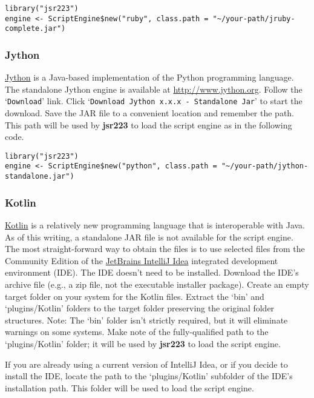 \documentclass[
article,
11pt, %
a4paper, %
oneside, %
headinclude,footinclude, %
]{scrartcl}
\theoremstyle{definition} %
\theoremstyle{plain} %
\theoremstyle{remark} %
\newcommand{\pkg}[1]{\textbf{#1}}
\newcommand{\file}[1]{{`\normalfont\textsf{#1}'}}
\newcommand{\samp}[1]{{`\normalfont\texttt{#1}'}}
\newcommand{\strong}[1]{\texorpdfstring{{\normalfont\fontseries{b}\selectfont #1}}{#1}}
\begin{document}
\begin{verbatim}
library("jsr223")
engine <- ScriptEngine$new("ruby", class.path = "~/your-path/jruby-complete.jar")
\end{verbatim}

\subsubsection{Jython}

\href{http://www.jython.org}{Jython} is a Java-based implementation of the Python programming language. The standalone Jython engine is available at \url{http://www.jython.org}. Follow the \samp{Download} link. Click \samp{Download Jython x.x.x - Standalone Jar} to start the download. Save the JAR file to a convenient location and remember the path. This path will be used by \pkg{jsr223} to load the script engine as in the following code.

\begin{verbatim}
library("jsr223")
engine <- ScriptEngine$new("python", class.path = "~/your-path/jython-standalone.jar")
\end{verbatim}

\hypertarget{kotlin-script-engine-installation}{}
\subsubsection{Kotlin}

\href{https://kotlinlang.org/}{Kotlin} is a relatively new programming language that is interoperable with Java. As of this writing, a standalone JAR file is not available for the script engine. The most straight-forward way to obtain the files is to use selected files from the Community Edition of the \href{https://www.jetbrains.com/idea/}{JetBrains IntelliJ Idea} integrated development environment (IDE). The IDE doesn't need to be installed. Download the IDE's archive file (e.g., a zip file, not the executable installer package). Create an empty target folder on your system for the Kotlin files. Extract the \file{bin} and \file{plugins/Kotlin} folders to the target folder preserving the original folder structures. \strong{Note:} The \file{bin} folder isn't strictly required, but it will eliminate warnings on some systems. Make note of the fully-qualified path to the \file{plugins/Kotlin} folder; it will be used by \pkg{jsr223} to load the script engine.

If you are already using a current version of IntelliJ Idea, or if you decide to install the IDE, locate the path to the \file{plugins/Kotlin} subfolder of the IDE's installation path. This folder will be used to load the script engine.
\end{document}
